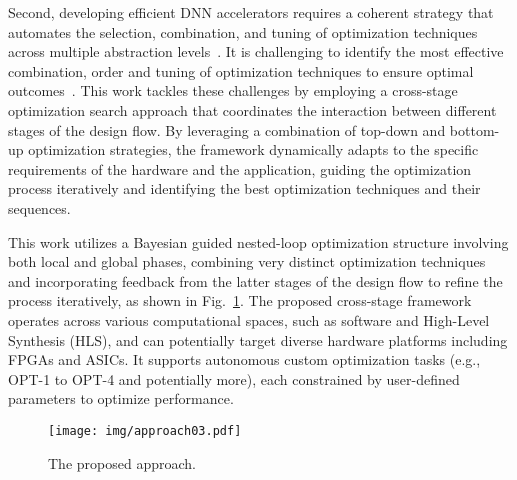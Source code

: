 Second, developing efficient DNN accelerators requires a coherent strategy that automates the selection, combination, and tuning of optimization techniques across multiple abstraction levels~\cite{ney2021half, abdelfattah2020best, yang2019synetgy,zhang2022algorithm}. It is challenging to identify the most effective combination, order and tuning of optimization techniques to ensure optimal outcomes~\cite{zhang2020dnnexplorer, xu2020autodnnchip}. This work tackles these challenges by employing a cross-stage optimization search approach that coordinates the interaction between different stages of the design flow. By leveraging a combination of top-down and bottom-up optimization strategies, the framework dynamically adapts to the specific requirements of the hardware and the application, guiding the optimization process iteratively and identifying the best optimization techniques and their sequences. 

This work utilizes a Bayesian guided nested-loop optimization structure involving both local and global phases, combining very distinct optimization techniques and incorporating feedback from the latter stages of the design flow to refine the process iteratively, as shown in Fig.~\ref{fig:approach}. 
The proposed cross-stage framework operates across various computational spaces, such as software and High-Level Synthesis (HLS), and can potentially target diverse hardware platforms including FPGAs and ASICs. It supports autonomous custom optimization tasks (e.g., OPT-1 to OPT-4 and potentially more), each constrained by user-defined parameters to optimize performance. 


\begin{figure}
\begin{center}
\texttt{[image: img/approach03.pdf]}
\end{center}
   \caption{The proposed approach.}
\label{fig:approach}
\end{figure}


